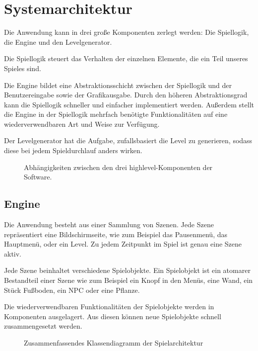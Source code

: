 
\chapter{Systemarchitektur}

Die Anwendung kann in drei große Komponenten zerlegt werden: Die Spiellogik, die Engine und den Levelgenerator.

Die Spiellogik steuert das Verhalten der einzelnen Elemente, die ein Teil unseres Spieles sind.

Die Engine bildet eine Abstraktionsschicht zwischen der Spiellogik und der Benutzereingabe sowie der Grafikausgabe. Durch den höheren Abstraktionsgrad kann die Spiellogik schneller und einfacher implementiert werden. Außerdem stellt die Engine in der Spiellogik mehrfach benötigte Funktionalitäten auf eine wiederverwendbaren Art und Weise zur Verfügung.

Der Levelgenerator hat die Aufgabe, zufallsbasiert die Level zu generieren, sodass diese bei jedem Spieldurchlauf anders wirken.

\begin{figure}[h]
	\centering
	
	\caption{Abhängigkeiten zwischen den drei highlevel-Komponenten der Software.}
\end{figure}

\section{Engine}

Die Anwendung besteht aus einer Sammlung von Szenen. Jede Szene repräsentiert eine Bildschirmseite, wie zum Beispiel das Pausenmenü, das Hauptmenü, oder ein Level. Zu jedem Zeitpunkt im Spiel ist genau eine Szene aktiv.

Jede Szene beinhaltet verschiedene Spielobjekte. Ein Spielobjekt ist ein atomarer Bestandteil einer Szene wie zum Beispiel ein Knopf in den Menüs, eine Wand, ein Stück Fußboden, ein NPC oder eine Pflanze.

Die wiederverwendbaren Funktionalitäten der Spielobjekte werden in Komponenten ausgelagert. Aus diesen können neue Spielobjekte schnell zusammengesetzt werden.

\begin{landscape}
	\begin{figure}
		\scalebox{0.75}{}
		\caption{Zusammenfassendes Klassendiagramm der Spielarchitektur}
	\end{figure}
\end{landscape}

